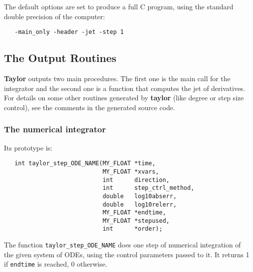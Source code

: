 \documentclass{article}
\begin{document}
\noindent
The default options are set to produce a full C program, using the
standard double precision of the computer:
\begin{verbatim}
   -main_only -header -jet -step 1
\end{verbatim}

\subsection{The Output Routines}\label{sec:or}
{\bf Taylor} outputs two main procedures. The first one is the main
call for the integrator and the second one is a function that computes
the jet of derivatives. For details on some other routines generated
by {\bf taylor} (like degree or step size control), see the comments
in the generated source code.

\subsubsection{The numerical integrator}\label{sec:tnu}
Its prototype is:
\begin{verbatim}
   int taylor_step_ODE_NAME(MY_FLOAT *time,
                            MY_FLOAT *xvars,
                            int      direction,
                            int      step_ctrl_method,
                            double   log10abserr,
                            double   log10relerr,
                            MY_FLOAT *endtime,
                            MY_FLOAT *stepused,
                            int      *order);
\end{verbatim}
The function \verb+taylor_step_ODE_NAME+ does one step of numerical
integration of the given system of ODEs, using the control parameters
passed to it. It returns 1 if \verb+endtime+ is reached, 0 otherwise.

\newpage
\end{document}
